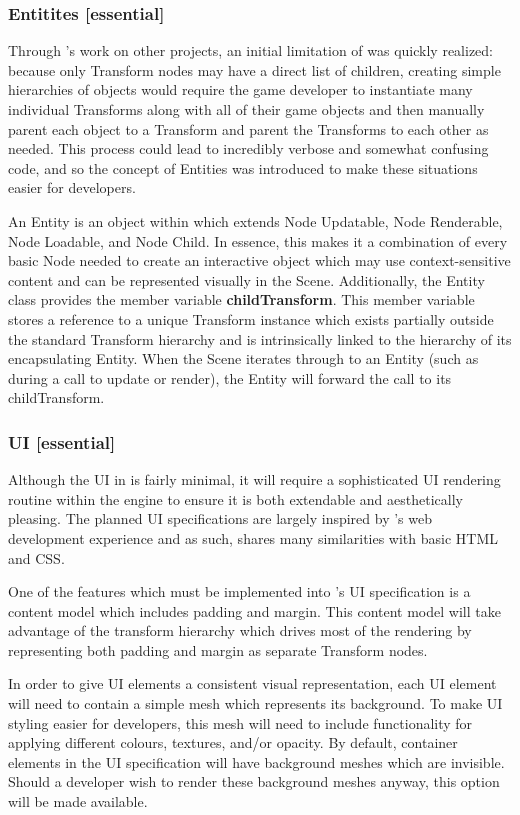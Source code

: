 \documentclass{GlobalDocument}
\begin{document}
\subsubsection{Entitites [essential]}
Through \ourteam{}'s work on other projects, an initial limitation of \ourengine{} was quickly realized: because only Transform nodes may have a direct list of children, creating simple hierarchies of objects would require the game developer to instantiate many individual Transforms along with all of their game objects and then manually parent each object to a Transform and parent the Transforms to each other as needed. This process could lead to incredibly verbose and somewhat confusing code, and so the concept of Entities was introduced to make these situations easier for developers.

An Entity is an object within \ourengine{} which extends Node Updatable, Node Renderable, Node Loadable, and Node Child. In essence, this makes it a combination of every basic Node needed to create an interactive object which may use context-sensitive content and can be represented visually in the Scene. Additionally, the Entity class provides the member variable \textbf{childTransform}. This member variable stores a reference to a unique Transform instance which exists partially outside the standard Transform hierarchy and is intrinsically linked to the hierarchy of its encapsulating Entity. When the Scene iterates through to an Entity (such as during a call to update or render), the Entity will forward the call to its childTransform.

\subsubsection{UI [essential]}
Although the UI in \ourgame{} is fairly minimal, it will require a sophisticated UI rendering routine within the engine to ensure it is both extendable and aesthetically pleasing. The planned UI specifications are largely inspired by \ourteam{}'s web development experience and as such, shares many similarities with basic HTML and CSS.

One of the features which must be implemented into \ourengine{}'s UI specification is a content model which includes padding and margin. This content model will take advantage of the transform hierarchy which drives most of the rendering by representing both padding and margin as separate Transform nodes.

In order to give UI elements a consistent visual representation, each UI element will need to contain a simple mesh which represents its background. To make UI styling easier for developers, this mesh will need to include functionality for applying different colours, textures, and/or opacity. By default, container elements in the UI specification will have background meshes which are invisible. Should a developer wish to render these background meshes anyway, this option will be made available.
\end{document}
